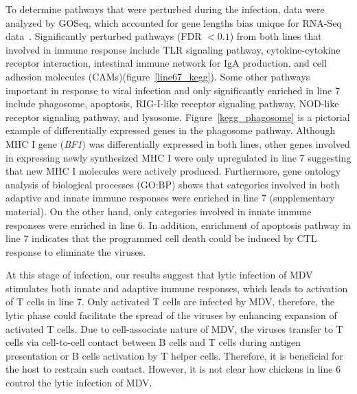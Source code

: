 \documentclass[10pt]{article}
\begin{document}
To determine pathways that were perturbed during the infection, data were
analyzed by GOSeq, which accounted for gene lengths bias unique for RNA-Seq
data~\cite{young2010method}.  Significantly perturbed pathways (FDR $< 0.1$)
from both lines that involved in immune response include TLR signaling pathway,
cytokine-cytokine receptor interaction, intestinal immune network for IgA
production, and cell adhesion molecules (CAMs)(figure~\ref{line67_kegg}).  Some
other pathways important in response to viral infection and only significantly
enriched in line 7 include phagosome, apoptosis, RIG-I-like receptor signaling
pathway, NOD-like receptor signaling pathway, and lysosome.
Figure~\ref{kegg_phagosome} is a pictorial example of differentially expressed
genes in the phagosome pathway.  Although MHC I gene ({\em BF1}) was
differentially expressed in both lines, other genes involved in expressing newly
synthesized MHC I were only upregulated in line 7 suggesting that new MHC I
molecules were actively produced.  Furthermore, gene ontology analysis of
biological processes (GO:BP) shows that categories involved in both adaptive and
innate immune responses were enriched in line 7 (supplementary material).  On
the other hand, only categories involved in innate immune responses were
enriched in line 6.  In addition, enrichment of apoptosis pathway in line 7
indicates that the programmed cell death could be induced by CTL response to
eliminate the viruses.

At this stage of infection, our results suggest that lytic infection of MDV
stimulates both innate and adaptive immune responses, which leads to activation
of T cells in line 7.  Only activated T cells are infected by MDV, therefore,
the lytic phase could facilitate the spread of the viruses by enhancing
expansion of activated T cells.  Due to cell-associate nature of MDV, the
viruses transfer to T cells via cell-to-cell contact between B cells and T cells
during antigen presentation or B cells activation by T helper cells.  Therefore,
it is beneficial for the host to restrain such contact.  However, it is not
clear how chickens in line 6 control the lytic infection of MDV.
\end{document}
